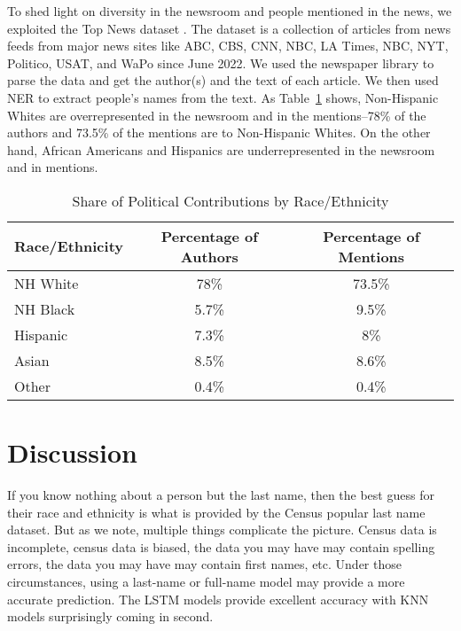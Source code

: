 \documentclass[12pt, letterpaper]{article}
\begin{document}
To shed light on diversity in the newsroom and people mentioned in the news, we exploited the Top News dataset \citep{willis2023}. The dataset is a collection of articles from news feeds from major news sites like ABC, CBS, CNN, NBC, LA Times, NBC, NYT, Politico, USAT, and WaPo since June 2022. We used the newspaper library \citep{lucas} to parse the data and get the author(s) and the text of each article. We then used NER to extract people's names from the text. As Table~\ref{table:news} shows, Non-Hispanic Whites are overrepresented in the newsroom and in the mentions--78\% of the authors and 73.5\% of the mentions are to Non-Hispanic Whites. On the other hand, African Americans and Hispanics are underrepresented in the newsroom and in mentions.

\begin{table}[ht!]
\centering
\caption{Share of Political Contributions by Race/Ethnicity}
\label{table:news}
\begin{tabular}{lcc}
\hline
Race/Ethnicity & Percentage of Authors & Percentage of Mentions \\
\hline
NH White & 78\% & 73.5\% \\
NH Black & 5.7\% & 9.5\% \\
Hispanic & 7.3\% & 8\% \\
Asian & 8.5\% & 8.6\% \\
Other & 0.4\% & 0.4\% \\
\hline
\end{tabular}
\end{table}

\section*{Discussion}
If you know nothing about a person but the last name, then the best guess for their race and ethnicity is what is provided by the Census popular last name dataset. But as we note, multiple things complicate the picture. Census data is incomplete, census data is biased, the data you may have may contain spelling errors, the data you may have may contain first names, etc. Under those circumstances, using a last-name or full-name model may provide a more accurate prediction. The LSTM models provide excellent accuracy with KNN models surprisingly coming in second.

\clearpage


\clearpage

\appendix
\renewcommand{\thesection}{SI \arabic{section}}
\renewcommand\thetable{\thesection.\arabic{table}}  
\renewcommand\thefigure{\thesection.\arabic{figure}}
\end{document}
